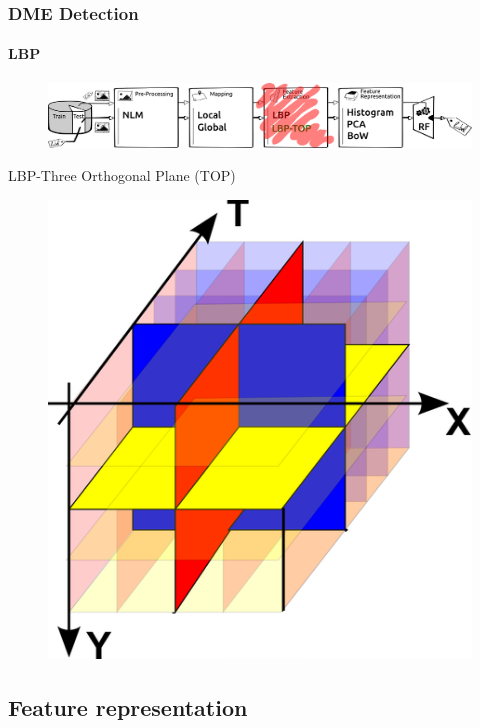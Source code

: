 \documentclass{beamer}
\begin{document}
\begin{frame}
  \frametitle{DME Detection}
  \framesubtitle{LBP}
  \begin{figure}
    \centering
    \includegraphics[width=.5\textwidth]{./images/ml-fe2.png}
  \end{figure}
  \begin{block}{LBP-Three Orthogonal Plane (TOP)}
    \begin{figure}
      \centering
      \includegraphics[width=.2\textwidth]{./images/lbp_top.png}
    \end{figure}
  \end{block}
\end{frame}

\subsection{Feature representation}
\end{document}
